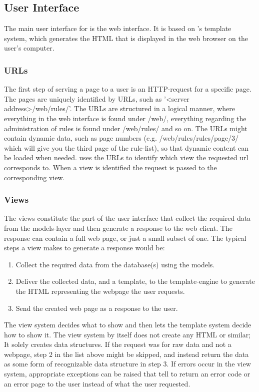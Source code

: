 \subsection{User Interface}
The main user interface for \snowman{} is the web interface. It is based on
\django{}'s template system, which generates the HTML that is displayed in the
web browser on the user's computer. 

\subsubsection{URLs}
\label{sect:django_urls}

The first step of serving a page to a user is an HTTP-request for a specific
page. The pages are uniquely identified by URLs, such as '<server
address>/web/rules/'. The URLs are structured in a logical manner, where
everything in the web interface is found under /web/, everything regarding the
administration of rules is found under /web/rules/ and so on. The URLs might
contain dynamic data, such as page numbers (e.g. /web/rules/rules/page/3/ which
will give you the third page of the rule-list), so that dynamic content can be
loaded when needed. \django{} uses the URLs to identify which view the requested
url corresponds to. When a view is identified the request is passed to the
corresponding view.

\subsubsection{Views}

The views constitute the part of the user interface that collect the required
data from the models-layer and then generate a response to the web client. The
response can contain a full web page, or just a small subset of one. The typical
steps a view makes to generate a response would be:
\begin{enumerate}
  \item Collect the required data from the database(s) using the \django{}
  models.
  \item Deliver the collected data, and a template, to the template-engine to
  generate the HTML representing the webpage the user requests.
  \item Send the created web page as a response to the user.
\end{enumerate}
The view system decides what to show and then lets the template system decide
how to show it. The view system by itself does not create any HTML or
similar; It solely creates data structures. If the request was for raw data and
not a webpage, step 2 in the list above might be skipped, and instead return the data as some form of recognizable data
structure in step 3. If errors occur in the view system, appropriate exceptions
can be raised that tell \django{} to return an error code or an error page to the user instead of
what the user requested.


